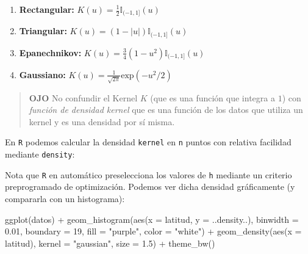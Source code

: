 \documentclass[
]{book}
\newenvironment{Shaded}{\begin{snugshade}}{\end{snugshade}}
\newcommand{\AttributeTok}[1]{\textcolor[rgb]{0.77,0.63,0.00}{#1}}
\newcommand{\ConstantTok}[1]{\textcolor[rgb]{0.00,0.00,0.00}{#1}}
\newcommand{\DecValTok}[1]{\textcolor[rgb]{0.00,0.00,0.81}{#1}}
\newcommand{\FloatTok}[1]{\textcolor[rgb]{0.00,0.00,0.81}{#1}}
\newcommand{\FunctionTok}[1]{\textcolor[rgb]{0.00,0.00,0.00}{#1}}
\newcommand{\NormalTok}[1]{#1}
\newcommand{\OtherTok}[1]{\textcolor[rgb]{0.56,0.35,0.01}{#1}}
\newcommand{\SpecialCharTok}[1]{\textcolor[rgb]{0.00,0.00,0.00}{#1}}
\newcommand{\StringTok}[1]{\textcolor[rgb]{0.31,0.60,0.02}{#1}}
\begin{document}
\begin{enumerate}
\def\labelenumi{\arabic{enumi}.}
\item
  \textbf{Rectangular:} \(K(u) = \frac{1}{2} \mathbb{I}_{(-1, 1]}(u)\)
\item
  \textbf{Triangular:} \(K(u) = (1 - |u|) \mathbb{I}_{(-1, 1]}(u)\)
\item
  \textbf{Epanechnikov:} \(K(u) = \frac{3}{4}(1 - u^2) \mathbb{I}_{(-1, 1]}(u)\)
\item
  \textbf{Gaussiano:} \(K(u) = \frac{1}{\sqrt{2\pi}}\text{exp}(-u^2/2)\)
\end{enumerate}

\begin{quote}
\textbf{OJO} No confundir el Kernel \(K\) (que es una función que integra a \(1\)) con \emph{función de densidad kernel} que es una función de los datos que utiliza un kernel y es una densidad por sí misma.
\end{quote}

En \texttt{R} podemos calcular la densidad \texttt{kernel} en \texttt{n} puntos con relativa facilidad mediante \texttt{density}:

\begin{Shaded}
\end{Shaded}

Nota que \texttt{R} en automático preselecciona los valores de \texttt{h} mediante un criterio preprogramado de optimización. Podemos ver dicha densidad gráficamente (y compararla con un histograma):

\begin{Shaded}
\begin{Highlighting}[]
\FunctionTok{ggplot}\NormalTok{(datos) }\SpecialCharTok{+}
  \FunctionTok{geom\_histogram}\NormalTok{(}\FunctionTok{aes}\NormalTok{(}\AttributeTok{x =}\NormalTok{ latitud, }\AttributeTok{y =}\NormalTok{ ..density..), }
                 \AttributeTok{binwidth =} \FloatTok{0.01}\NormalTok{, }\AttributeTok{boundary =} \DecValTok{19}\NormalTok{,}
                 \AttributeTok{fill =} \StringTok{"purple"}\NormalTok{, }\AttributeTok{color =} \StringTok{"white"}\NormalTok{) }\SpecialCharTok{+}
  \FunctionTok{geom\_density}\NormalTok{(}\FunctionTok{aes}\NormalTok{(}\AttributeTok{x =}\NormalTok{ latitud), }\AttributeTok{kernel =} \StringTok{"gaussian"}\NormalTok{, }\AttributeTok{size =} \FloatTok{1.5}\NormalTok{) }\SpecialCharTok{+}
  \FunctionTok{theme\_bw}\NormalTok{()}
\end{Highlighting}
\end{Shaded}
\end{document}
